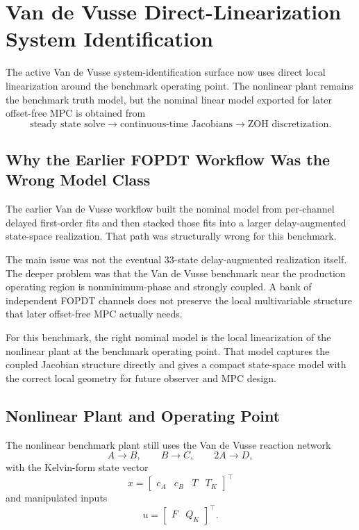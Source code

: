 \section{Van de Vusse Direct-Linearization System Identification}

The active Van de Vusse system-identification surface now uses direct local linearization around the benchmark operating point. The nonlinear plant remains the benchmark truth model, but the nominal linear model exported for later offset-free MPC is obtained from
\[
\text{steady state solve} \rightarrow \text{continuous-time Jacobians} \rightarrow \text{ZOH discretization}.
\]

\subsection{Why the Earlier FOPDT Workflow Was the Wrong Model Class}

The earlier Van de Vusse workflow built the nominal model from per-channel delayed first-order fits and then stacked those fits into a larger delay-augmented state-space realization. That path was structurally wrong for this benchmark.

The main issue was not the eventual 33-state delay-augmented realization itself. The deeper problem was that the Van de Vusse benchmark near the production operating region is nonminimum-phase and strongly coupled. A bank of independent FOPDT channels does not preserve the local multivariable structure that later offset-free MPC actually needs.

For this benchmark, the right nominal model is the local linearization of the nonlinear plant at the benchmark operating point. That model captures the coupled Jacobian structure directly and gives a compact state-space model with the correct local geometry for future observer and MPC design.

\subsection{Nonlinear Plant and Operating Point}

The nonlinear benchmark plant still uses the Van de Vusse reaction network
\[
A \rightarrow B,\qquad B \rightarrow C,\qquad 2A \rightarrow D,
\]
with the Kelvin-form state vector
\[
x = \begin{bmatrix} c_A & c_B & T & T_K \end{bmatrix}^{\top}
\]
and manipulated inputs
\[
u = \begin{bmatrix} F & Q_K \end{bmatrix}^{\top}.
\]

